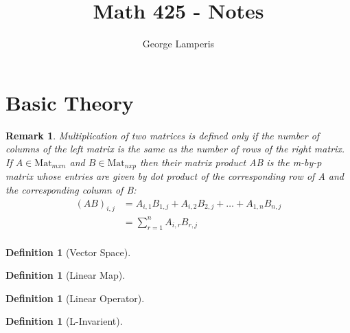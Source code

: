 \documentclass[12pt]{article}
\title{Math 425 - Notes}
\author{George Lamperis}
\date{}
\theoremstyle{mystyle}
\newtheorem{defn}[thm]{Definition}
\newtheorem{remark}[thm]{Remark}
\newcommand{\Mat}[2]{\text{Mat}_{#1 x #2}}
\begin{document}
\maketitle

\section{Basic Theory}

\begin{remark}
  Multiplication of two matrices is defined only if the number of columns of the
  left matrix is the same as the number of rows of the right matrix. If 
  $A \in \Mat{m}{n}$ and $B \in \Mat{n}{p}$ then their matrix product AB is the
  m-by-p matrix whose entries are given by dot product of the corresponding row
  of A and the corresponding column of B:
  \begin{align*}
  (AB)_{i,j} &= A_{i,1}B_{1,j} + A_{i,2}B_{2,j} + \ldots +  A_{1,n}B_{n,j} \\
             &= \sum_{r=1}^n A_{i,r}B_{r,j} \\
  \end{align*}
  
\end{remark}


\begin{defn}[Vector Space]
\end{defn}

\begin{defn}[Linear Map]
\end{defn}

\begin{defn}[Linear Operator]
\end{defn}

\begin{defn}[L-Invarient]
\end{defn}
\end{document}
